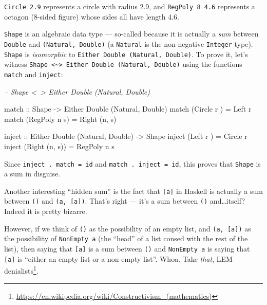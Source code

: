 \documentclass[]{article}
\newenvironment{Shaded}{}{}
\newcommand{\CommentTok}[1]{\textcolor[rgb]{0.38,0.63,0.69}{\textit{#1}}}
\newcommand{\DataTypeTok}[1]{\textcolor[rgb]{0.56,0.13,0.00}{#1}}
\newcommand{\FunctionTok}[1]{\textcolor[rgb]{0.02,0.16,0.49}{#1}}
\newcommand{\NormalTok}[1]{#1}
\newcommand{\OtherTok}[1]{\textcolor[rgb]{0.00,0.44,0.13}{#1}}
\renewcommand{\href}[2]{#2\footnote{\url{#1}}}
\begin{document}
\texttt{Circle\ 2.9} represents a circle with radius 2.9, and
\texttt{RegPoly\ 8\ 4.6} represents a octagon (8-sided figure) whose sides all
have length 4.6.

\texttt{Shape} is an algebraic data type --- so-called because it is actually a
\emph{sum} between \texttt{Double} and \texttt{(Natural,\ Double)} (a
\texttt{Natural} is the non-negative \texttt{Integer} type). \texttt{Shape} is
\emph{isomorphic} to \texttt{Either\ Double\ (Natural,\ Double)}. To prove it,
let's witness
\texttt{Shape\ \textless{}\textasciitilde{}\textgreater{}\ Either\ Double\ (Natural,\ Double)}
using the functions \texttt{match} and \texttt{inject}:

\begin{Shaded}
\begin{Highlighting}[]
\CommentTok{-- Shape <~> Either Double (Natural, Double)}

\OtherTok{match ::} \DataTypeTok{Shape} \OtherTok{->} \DataTypeTok{Either} \DataTypeTok{Double}\NormalTok{ (}\DataTypeTok{Natural}\NormalTok{, }\DataTypeTok{Double}\NormalTok{)}
\NormalTok{match (}\DataTypeTok{Circle}\NormalTok{  r  ) }\FunctionTok{=} \DataTypeTok{Left}\NormalTok{ r}
\NormalTok{match (}\DataTypeTok{RegPoly}\NormalTok{ n s) }\FunctionTok{=} \DataTypeTok{Right}\NormalTok{ (n, s)}

\OtherTok{inject ::} \DataTypeTok{Either} \DataTypeTok{Double}\NormalTok{ (}\DataTypeTok{Natural}\NormalTok{, }\DataTypeTok{Double}\NormalTok{) }\OtherTok{->} \DataTypeTok{Shape}
\NormalTok{inject (}\DataTypeTok{Left}\NormalTok{   r    ) }\FunctionTok{=} \DataTypeTok{Circle}\NormalTok{  r}
\NormalTok{inject (}\DataTypeTok{Right}\NormalTok{ (n, s)) }\FunctionTok{=} \DataTypeTok{RegPoly}\NormalTok{ n s}
\end{Highlighting}
\end{Shaded}

Since \texttt{inject\ .\ match\ =\ id} and \texttt{match\ .\ inject\ =\ id},
this proves that \texttt{Shape} is a sum in disguise.

Another interesting ``hidden sum'' is the fact that \texttt{{[}a{]}} in Haskell
is actually a sum between \texttt{()} and \texttt{(a,\ {[}a{]})}. That's right
--- it's a sum between \texttt{()} and\ldots{}itself? Indeed it is pretty
bizarre.

However, if we think of \texttt{()} as the possibility of an empty list, and
\texttt{(a,\ {[}a{]})} as the possibility of \texttt{NonEmpty\ a} (the ``head''
of a list consed with the rest of the list), then saying that \texttt{{[}a{]}}
is a sum between \texttt{()} and \texttt{NonEmpty\ a} is saying that
\texttt{{[}a{]}} is ``either an empty list or a non-empty list''. Whoa. Take
\emph{that},
\href{https://en.wikipedia.org/wiki/Constructivism_(mathematics)}{LEM
denialists}.
\end{document}
